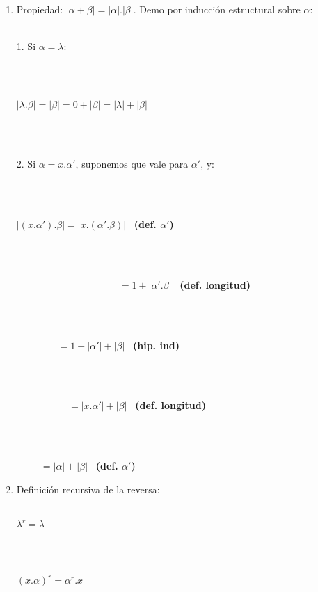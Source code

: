 \documentclass{article}
\begin{document}
{{\begin{enumerate}
    \item {Propiedad: $|\alpha + \beta| = |\alpha|.|\beta|$. Demo por inducción estructural sobre $\alpha$:}
    \\
    \\
    \centerline{1. Si $\alpha = \lambda$:}
    \\
    \\
    \centerline{$|\lambda.\beta| = |\beta| = 0 + |\beta| = |\lambda| + |\beta|$}
    \\
    \\
    \centerline{2. Si $\alpha = x.\alpha'$, suponemos que vale para $\alpha'$, y:}
    \\
    \\
    \centerline{$|(x.\alpha').\beta| = |x.(\alpha'.\beta)|$ \ \textbf{(def. $\alpha'$)}}
    \\
    \\
    \centerline{ \ \ \ \ \ \ \ \ \ \ \ \ \ \ \ \ \ \ \ \ \ $= 1 +|\alpha'.\beta|$  \ \textbf{(def. longitud)}}
    \\
    \\
    \centerline{$ \ \ \ \ \ \ \ \ \ \ \ \ \ \ \ \ \ \ \ = 1 +|\alpha'| + |\beta|$ \ \textbf{(hip. ind)}}
    \\
    \\
    \centerline{$ \ \ \ \ \ \ \ \ \ \ \ \ \ \ \ \ \ \ \ \ \ \ \ \ = |x.\alpha'| + |\beta|$ \ \textbf{(def. longitud)}}
    \\
    \\
    \centerline{$ \ \ \ \ \ \ \ \ \ \ \ = |\alpha| + |\beta|$ \ \textbf{(def. $\alpha'$)}}    

    \item {Definición recursiva de la reversa:}
    \\
    \\
    \centerline{$\lambda^r = \lambda$}
    \\
    \\
    \centerline{$(x.\alpha)^r = \alpha^r.x$}
\end{enumerate}


}}
\end{document}
